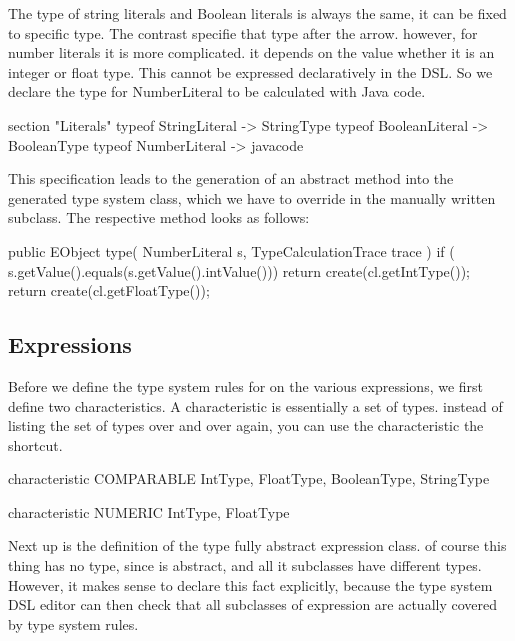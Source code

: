 The type of string literals and Boolean literals is always the same, it can be
fixed  to specific type. The contrast specifie that type after the arrow.
however, for number literals it is more complicated. it depends on the value
whether it is an integer or float type. This cannot be expressed declaratively
in the DSL. So we declare the type for NumberLiteral to be calculated with Java
code.

\begin{code}
section "Literals"
      typeof StringLiteral -> StringType
     typeof BooleanLiteral -> BooleanType
      typeof NumberLiteral -> javacode
\end{code}
 
 This specification leads to the generation of an abstract method into the
 generated type system class, which we have to override in the manually written
 subclass. The respective method looks as follows:
 
\begin{code}
public EObject type( NumberLiteral s, TypeCalculationTrace trace ) {
    if ( s.getValue().equals(s.getValue().intValue())) {
        return create(cl.getIntType());
    }
    return create(cl.getFloatType());
} 
\end{code} 



\subsection{Expressions}

Before we define the type system rules for on the various expressions,  we first
define two characteristics. A characteristic is essentially a set of types.
instead of listing the set of types over and over again, you can use the
characteristic the shortcut.

\begin{code}
characteristic COMPARABLE {
    IntType, FloatType, BooleanType, StringType
}  
  
    characteristic NUMERIC {
    IntType, FloatType
} 
\end{code}

Next up is the definition of the type fully abstract expression class. of course
this thing has no type, since is abstract, and all it subclasses have different
types. However, it makes sense to declare this fact explicitly, because the type
system DSL editor can then check that all subclasses of expression are actually
covered by type system rules.

